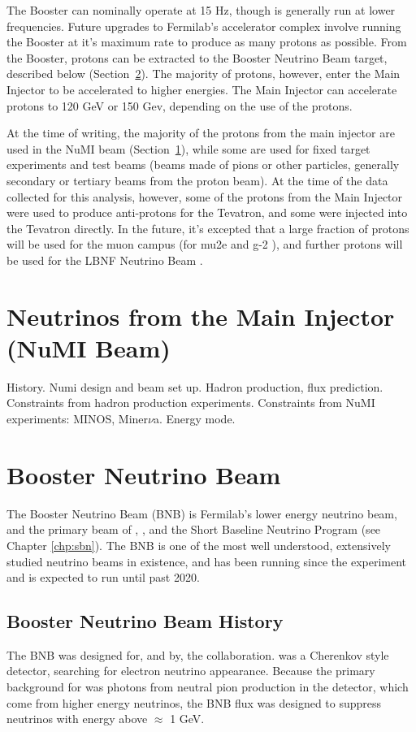 The Booster can nominally operate at 15 Hz, though is generally run at lower frequencies.  Future upgrades to Fermilab's accelerator complex involve running the Booster at it's maximum rate to produce as many protons as possible.  From the Booster, protons can be extracted to the Booster Neutrino Beam target, described below (Section~\ref{sec:bnb}).  The majority of protons, however, enter the Main Injector to be accelerated to higher energies.  The Main Injector can accelerate protons to 120 GeV or 150 Gev, depending on the use of the protons.

At the time of writing, the majority of the protons from the main injector are used in the NuMI beam (Section~\ref{sec:numi_beam}), while some are used for fixed target experiments and test beams (beams made of pions or other particles, generally secondary or tertiary beams from the proton beam).  At the time of the data collected for this analysis, however, some of the protons from the Main Injector were used to produce anti-protons for the Tevatron, and some were injected into the Tevatron directly.  In the future, it's excepted that a large fraction of protons will be used for the muon campus (for mu2e and g-2 \cite{mu2e} \cite{g-2}), and further protons will be used for the LBNF Neutrino Beam \cite{LBNF-beam}.

\section{Neutrinos from the Main Injector (NuMI Beam)}
\label{sec:numi_beam}

History. Numi design and beam set up.  Hadron production, flux prediction.  Constraints from hadron production experiments.  Constraints from NuMI experiments: MINOS, Miner$\nu$a.  Energy mode.

\section{Booster Neutrino Beam}
\label{sec:bnb}

The Booster Neutrino Beam (BNB) is Fermilab's lower energy neutrino beam, and the primary beam of \MB, \uboone, and the Short Baseline Neutrino Program (see Chapter \ref{chp:sbn}).  The BNB is one of the most well understood, extensively studied neutrino beams in existence, and has been running since the \MB experiment and is expected to run until past 2020.

\subsection{Booster Neutrino Beam History}
The BNB was designed for, and by, the \MB collaboration.  \MB was a Cherenkov style detector, searching for electron neutrino appearance.  Because the primary background for \MB was photons from neutral pion production in the detector, which come from higher energy neutrinos, the BNB flux was designed to suppress neutrinos with energy above $\approx$ 1 GeV.

